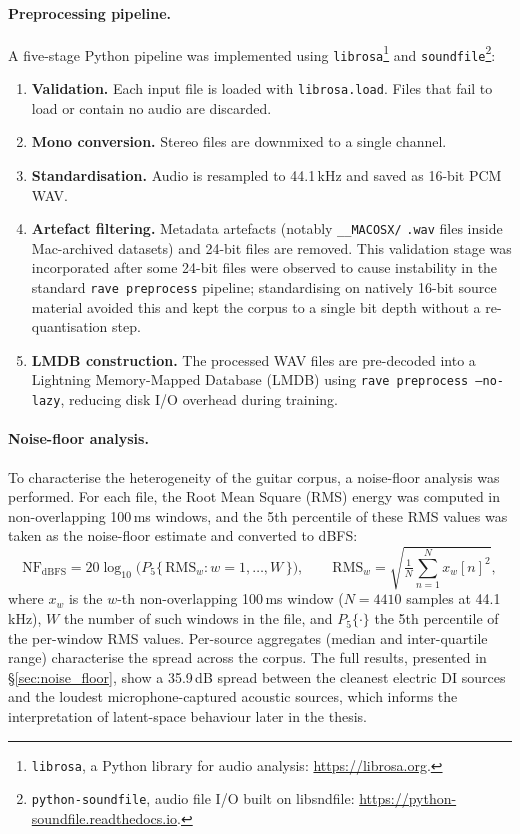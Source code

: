 \documentclass[a4paper,11pt,oneside,openany]{book}
\begin{document}
\paragraph{Preprocessing pipeline.} A five-stage Python pipeline was implemented using \texttt{librosa}\footnote{\texttt{librosa}, a Python library for audio analysis: \url{https://librosa.org}.} and \texttt{soundfile}\footnote{\texttt{python-soundfile}, audio file I/O built on libsndfile: \url{https://python-soundfile.readthedocs.io}.}:
\begin{enumerate}
\item \textbf{Validation.} Each input file is loaded with \texttt{librosa.load}. Files that fail to load or contain no audio are discarded.
\item \textbf{Mono conversion.} Stereo files are downmixed to a single channel.
\item \textbf{Standardisation.} Audio is resampled to 44.1\,kHz and saved as 16-bit PCM WAV.
\item \textbf{Artefact filtering.} Metadata artefacts (notably \texttt{\_\_MACOSX/} \texttt{.wav} files inside Mac-archived datasets) and 24-bit files are removed. This validation stage was incorporated after some 24-bit files were observed to cause instability in the standard \texttt{rave preprocess} pipeline; standardising on natively 16-bit source material avoided this and kept the corpus to a single bit depth without a re-quantisation step.
\item \textbf{LMDB construction.} The processed WAV files are pre-decoded into a Lightning Memory-Mapped Database (LMDB) using \texttt{rave preprocess --no-lazy}, reducing disk I/O overhead during training.
\end{enumerate}

\paragraph{Noise-floor analysis.} To characterise the heterogeneity of the guitar corpus, a noise-floor analysis was performed. For each file, the Root Mean Square (RMS) energy was computed in non-overlapping 100\,ms windows, and the 5th percentile of these RMS values was taken as the noise-floor estimate and converted to dBFS:
\begin{equation}
\mathrm{NF}_{\mathrm{dBFS}} = 20\log_{10}\!\Big(P_{5}\big\{\,\mathrm{RMS}_w : w = 1,\dots,W\,\big\}\Big),
\qquad
\mathrm{RMS}_w = \sqrt{\tfrac{1}{N}\sum_{n=1}^{N} x_w[n]^2},
\label{eq:noisefloor}
\end{equation}
where $x_w$ is the $w$-th non-overlapping 100\,ms window ($N = 4410$ samples at 44.1\,kHz), $W$ the number of such windows in the file, and $P_5\{\cdot\}$ the 5th percentile of the per-window RMS values. Per-source aggregates (median and inter-quartile range) characterise the spread across the corpus. The full results, presented in \S\ref{sec:noise_floor}, show a 35.9\,dB spread between the cleanest electric DI sources and the loudest microphone-captured acoustic sources, which informs the interpretation of latent-space behaviour later in the thesis.
\end{document}
